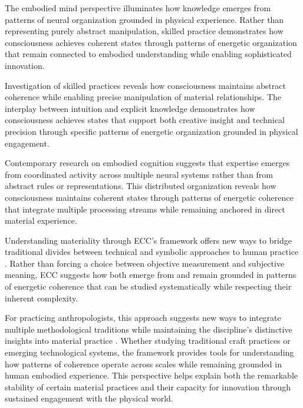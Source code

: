 The embodied mind perspective \cite{csordas1990embodiment} illuminates how knowledge emerges from patterns of neural organization grounded in physical experience. Rather than representing purely abstract manipulation, skilled practice demonstrates how consciousness achieves coherent states through patterns of energetic organization that remain connected to embodied understanding while enabling sophisticated innovation.

Investigation of skilled practices \cite{marchand2010making} reveals how consciousness maintains abstract coherence while enabling precise manipulation of material relationships. The interplay between intuition and explicit knowledge demonstrates how consciousness achieves states that support both creative insight and technical precision through specific patterns of energetic organization grounded in physical engagement.

Contemporary research on embodied cognition \cite{jackson1989knowledge} suggests that expertise emerges from coordinated activity across multiple neural systems rather than from abstract rules or representations. This distributed organization reveals how consciousness maintains coherent states through patterns of energetic coherence that integrate multiple processing streams while remaining anchored in direct material experience.

Understanding materiality through ECC's framework offers new ways to bridge traditional divides between technical and symbolic approaches to human practice \cite{ingold2013making}. Rather than forcing a choice between objective measurement and subjective meaning, ECC suggests how both emerge from and remain grounded in patterns of energetic coherence that can be studied systematically while respecting their inherent complexity.

For practicing anthropologists, this approach suggests new ways to integrate multiple methodological traditions while maintaining the discipline's distinctive insights into material practice \cite{warnier2001praxeological}. Whether studying traditional craft practices or emerging technological systems, the framework provides tools for understanding how patterns of coherence operate across scales while remaining grounded in human embodied experience. This perspective helps explain both the remarkable stability of certain material practices and their capacity for innovation through sustained engagement with the physical world.